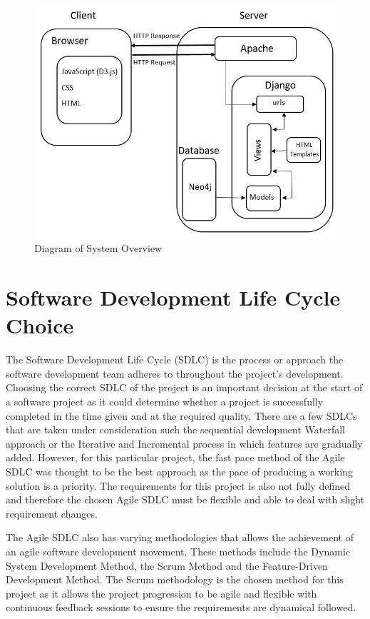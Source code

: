 \documentclass[10pt,onecolumn]{article}
\begin{document}
\begin{figure}[h]
	\centering
	\includegraphics[scale=0.65]{system.jpg}
	\caption{Diagram of System Overview}
	\label{system}
\end{figure}

\section{Software Development Life Cycle Choice}
The Software Development Life Cycle (SDLC) is the process or approach the software development team adheres to throughout the project's development. Choosing the correct SDLC of the project is an important decision at the start of a software project as it could determine whether a project is successfully completed in the time given and at the required quality. There are a few SDLCs that are taken under consideration such the sequential development Waterfall approach or the Iterative and Incremental process in which features are gradually added. However, for this particular project, the fast pace method of the Agile SDLC was thought to be the best approach as the pace of producing a working solution is a priority. The requirements for this project is also not fully defined and therefore the chosen Agile SDLC must be flexible and able to deal with slight requirement changes.

The Agile SDLC also has varying methodologies that allows the achievement of an agile software development movement. These methods include the Dynamic System Development Method, the Scrum Method and the Feature-Driven Development Method. The Scrum methodology is the chosen method for this project as it allows the project progression to be agile and flexible with continuous feedback sessions to ensure the requirements are dynamical followed\cite{Kinsey}.
\end{document}
